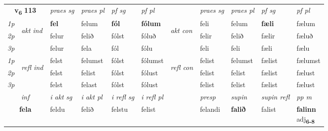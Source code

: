 \noindent
\begin{tabular}{lllllllllll} \toprule
\multicolumn{2}{c}{\textbf{v{\textsubscript{6}}} \Large{\textbf{113}}}  &  \textit{praes sg}  & \textit{praes pl}  &\textit{ pf sg} & \textit{pf pl} &  &  \textit{praes sg}  & \textit{praes pl}  & \textit{pf sg} & \textit{pf pl } \\*
	\cmidrule{3-6} \cmidrule{8-11}
 {\textit{1p}} & \multirow{3}{*}{\begin{turn}{90}\textit{akt ind}\end{turn}} & \textbf{fel} & felum & \textbf{fól} & \textbf{fólum} & \multirow{3}{*}{\begin{turn}{90}\textit{akt con}\end{turn}} &feli & felum & \textbf{fæli} & fælum\\*
 {\textit{2p}} &  &  felur  & felið & fólst & fóluð & & felir & felið & fælir & fæluð \\*
{\textit{3p}} &  & felur & fela & fól & fólu & & feli & feli& fæli & fælu \\*
\cmidrule{3-6} \cmidrule{8-11}
 {\textit{1p}} & \multirow{3}{*}{\begin{turn}{90}\textit{refl ind}\end{turn}}  & felst & felumst & fólst & fólumst & \multirow{3}{*}{\begin{turn}{90}\textit{refl con}\end{turn}}  &felist & felumst & fælist & fælumst \\*
 {\textit{2p}} &  & felst & felist & fólst & fólust & &felist & felist & fælist & fælust \\*
 {\textit{3p}}  & & felst & felast & fólst & fólust & & felist & felist& fælist & fælust \\*
\cmidrule{3-6} \cmidrule{8-11}

   \multicolumn{2}{c}{\textit{inf}}  & \textit{i akt sg} & \textit{i akt pl} & \textit{i refl sg} & \textit{i refl pl} && \textit{presp} & \textit{supin} & \textit{supin refl} & \textit{pp m} \\*
  \multicolumn{2}{c}{\textbf{fela}} & feldu  & felið & felstu & felist && felandi &  \textbf{falið} & falist & \specialcell{\textbf{falinn} \\ adj\textbf{\textsubscript{6-8}}} \\*
\end{tabular}

